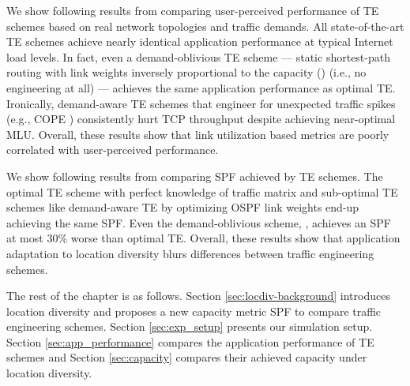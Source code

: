 We show following results from comparing user-perceived performance of TE schemes based on real network topologies and traffic demands. All state-of-the-art TE schemes achieve nearly identical application performance at typical Internet load levels. In fact, even a demand-oblivious TE scheme --- static shortest-path routing with link weights inversely proportional to the capacity (\invcap) (i.e., no engineering at all) --- achieves the same application performance as optimal TE. Ironically, demand-aware TE schemes that engineer for unexpected traffic spikes (e.g., COPE \cite{COPE}) consistently hurt TCP throughput despite achieving near-optimal MLU. Overall, these results show that link utilization based metrics are poorly correlated with user-perceived performance.

We show following results from comparing SPF achieved by TE schemes. The optimal TE scheme with perfect knowledge of traffic matrix and sub-optimal TE schemes like demand-aware TE by optimizing OSPF link weights \cite{fortz2000internet} end-up achieving the same SPF. Even the demand-oblivious scheme, \invcap, achieves an SPF at most 30\% worse than optimal TE. Overall, these results show that application adaptation to location diversity blurs differences between traffic engineering schemes.

The rest of the chapter is as follows. Section \ref{sec:locdiv-background} introduces location diversity and proposes a new capacity metric SPF to compare traffic engineering schemes. Section \ref{sec:exp_setup} presents our simulation setup. Section \ref{sec:app_performance} compares the application performance of TE schemes and Section \ref{sec:capacity} compares their achieved capacity under location diversity. 



 


